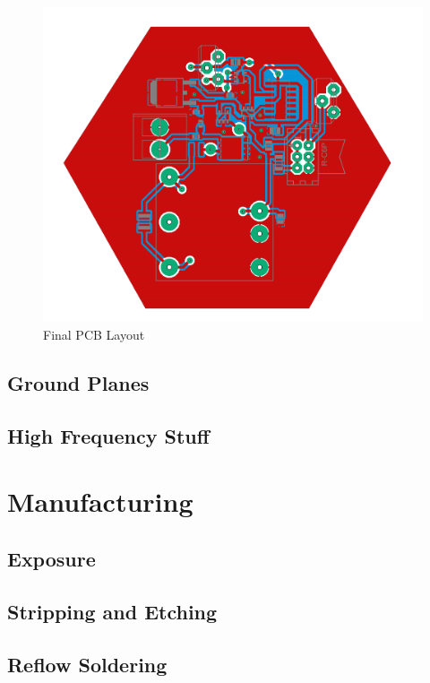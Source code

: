 \begin{figure}[h!]
    \centering
    \includegraphics[width=\textwidth]{kassandra/resources/Tesla6Final.PNG}
    \caption{Final PCB Layout}
    \label{fig:tesla_layout}
\end{figure}

\subsection{Ground Planes}

\subsection{High Frequency Stuff}

\section{Manufacturing}

\subsection{Exposure}

\subsection{Stripping and Etching}

\subsection{Reflow Soldering}